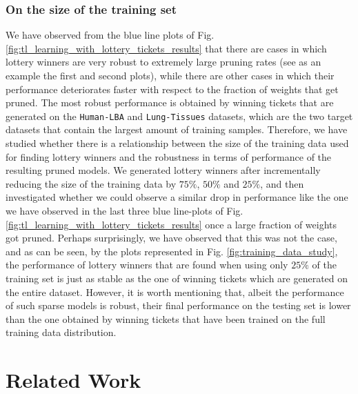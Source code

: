 



\subsubsection{On the size of the training set}
We have observed from the blue line plots of Fig. \ref{fig:tl_learning_with_lottery_tickets_results} that there are cases in which lottery winners are very robust to extremely large pruning rates (see as an example the first and second plots), while there are other cases in which their performance deteriorates faster with respect to the fraction of weights that get pruned. The most robust performance is obtained by winning tickets that are generated on the \texttt{Human-LBA} and \texttt{Lung-Tissues} datasets, which are the two target datasets that contain the largest amount of training samples. Therefore, we have studied whether there is a relationship between the size of the training data used for finding lottery winners and the robustness in terms of performance of the resulting pruned models. We generated lottery winners after incrementally reducing the size of the training data by $75\%$, $50\%$ and $25\%$, and then investigated whether we could observe a similar drop in performance like the one we have observed in the last three blue line-plots of Fig. \ref{fig:tl_learning_with_lottery_tickets_results} once a large fraction of weights got pruned. Perhaps surprisingly, we have observed that this was not the case, and as can be seen, by the plots represented in Fig. \ref{fig:training_data_study}, the performance of lottery winners that are found when using only $25\%$ of the training set is just as stable as the one of winning tickets which are generated on the entire dataset. However, it is worth mentioning that, albeit the performance of such sparse models is robust, their final performance on the testing set is lower than the one obtained by winning tickets that have been trained on the full training data distribution.




\section{Related Work}
\label{sec:related_work}

